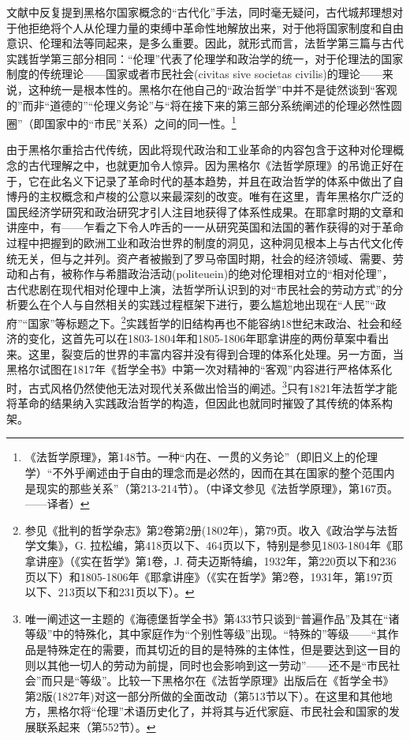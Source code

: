 文献中反复提到黑格尔国家概念的“古代化”手法，同时毫无疑问，古代城邦理想对于他拒绝将个人从伦理力量的束缚中革命性地解放出来，对于他将国家制度和自由意识、伦理和法等同起来，是多么重要。因此，就形式而言，法哲学第三篇与古代实践哲学第三部分相同：“伦理”代表了伦理学和政治学的统一，对于伦理法的国家制度的传统理论——国家或者市民社会(civitas sive societas civilis)的理论——来说，这种统一是根本性的。黑格尔在他自己的“政治哲学”中并不是徒然谈到“客观的”而非“道德的”“伦理义务论”与“将在接下来的第三部分系统阐述的伦理必然性圆圈”（即国家中的“市民”关系）之间的同一性。\footnote{《法哲学原理》，第148节。一种“内在、一贯的义务论”（即旧义上的伦理学）“不外乎阐述由于自由的理念而是必然的，因而在其在国家的整个范围内是现实的那些关系”（第213-214节）。（中译文参见《法哲学原理》，第167页。——译者）}

由于黑格尔重拾古代传统，因此将现代政治和工业革命的内容包含于这种对伦理概念的古代理解之中，也就更加令人惊异。因为黑格尔《法哲学原理》的吊诡正好在于，它在此名义下记录了革命时代的基本趋势，并且在政治哲学的体系中做出了自博丹的主权概念和卢梭的公意以来最深刻的改变。唯有在这里，青年黑格尔广泛的国民经济学研究和政治研究才引人注目地获得了体系性成果。在耶拿时期的文章和讲座中，有——乍看之下令人咋舌的一一从研究英国和法国的著作获得的对于革命过程中把握到的欧洲工业和政治世界的制度的洞见，这种洞见根本上与古代文化传统无关，但与之并列。资产者被搬到了罗马帝国时期，社会的经济领域、需要、劳动和占有，被称作与希腊政治活动(politeuein)的绝对伦理相对立的“相对伦理”，古代悲剧在现代相对伦理中上演，法哲学所认识到的对“市民社会的劳动方式”的分析要么在个人与自然相关的实践过程框架下进行，要么尴尬地出现在“人民”“政府”“国家”等标题之下。\footnote{参见《批判的哲学杂志》第2卷第2册(1802年)，第79页。收入《政治学与法哲学文集》，G. 拉松编，第418页以下、464页以下，特别是参见1803-1804年《耶拿讲座》（《实在哲学》第1卷，J. 荷夫迈斯特编，1932年，第220页以下和236页以下）和1805-1806年《耶拿讲座》（《实在哲学》第2卷，1931年，第197页以下、213页以下和231页以下）。}实践哲学的旧结构再也不能容纳18世纪末政治、社会和经济的变化，这首先可以在1803-1804年和1805-1806年耶拿讲座的两份草案中看出来。这里，裂变后的世界的丰富内容并没有得到合理的体系化处理。另一方面，当黑格尔试图在1817年《哲学全书》中第一次对精神的“客观”内容进行严格体系化时，古式风格仍然使他无法对现代关系做出恰当的阐述。\footnote{唯一阐述这一主题的《海德堡哲学全书》第433节只谈到“普遍作品”及其在“诸等级”中的特殊化，其中家庭作为“个别性等级”出现。“特殊的”等级——“其作品是特殊定在的需要，而其切近的目的是特殊的主体性，但是要达到这一目的则以其他一切人的劳动为前提，同时也会影响到这一劳动”——还不是“市民社会”而只是“等级”。比较一下黑格尔在《法哲学原理》出版后在《哲学全书》第2版(1827年)对这一部分所做的全面改动（第513节以下）。在这里和其他地方，黑格尔将“伦理”术语历史化了，并将其与近代家庭、市民社会和国家的发展联系起来（第552节）。}只有1821年法哲学才能将革命的结果纳入实践政治哲学的构造，但因此也就同时摧毁了其传统的体系构架。

